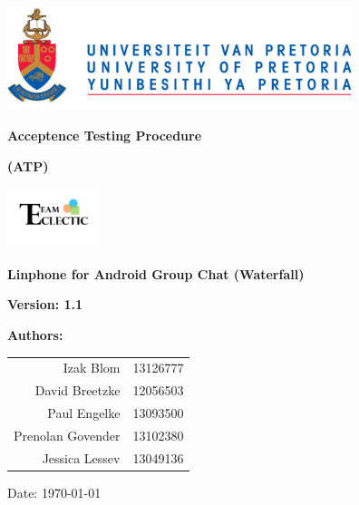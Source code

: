 \begin{titlepage}
\begin{flushright}

\includegraphics[width=380px]{../global/University_of_Pretoria_Logo.png}
\newline
\newline

\textbf {\LARGE Acceptence Testing Procedure} \newline

\textbf {\Large (ATP)}\newline

\centering\includegraphics[width=100px]{../global/Logo.jpg}

\flushright \textbf {\Large Linphone for Android Group Chat (Waterfall)}\newline

\flushright \textbf {\large Version: 1.1}\newline

\centering \textbf {\large Authors:}

\begin{table}[H]
\large
\centering
\begin{tabular}{rl}
	Izak Blom & 13126777 \\
	David Breetzke & 12056503 \\
	Paul Engelke & 13093500 \\
	Prenolan Govender & 13102380 \\
	Jessica Lessev & 13049136 \\
\end{tabular}
\end{table}

Date: \today

\end{flushright}
\end{titlepage}
